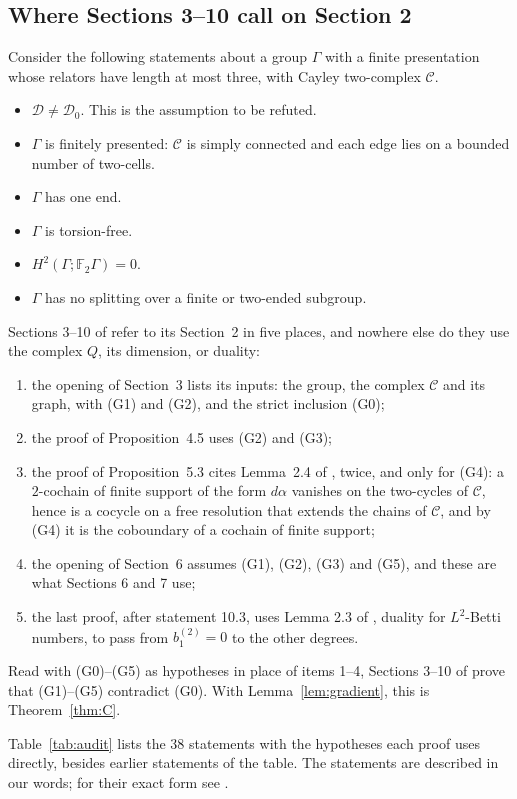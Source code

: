 \documentclass[11pt,a4paper]{article}
\theoremstyle{definition}
\theoremstyle{remark}
\newcommand{\F}{\mathbb{F}}
\newcommand{\Gam}{\Gamma}
\newcommand{\bt}[1]{b^{(2)}_{#1}}
\newcommand{\Dsp}{\mathcal{D}}
\newcommand{\Cay}{\mathcal{C}}
\begin{document}
\subsection{Where Sections 3--10 call on Section 2}\label{sub:interface}
Consider the following statements about a group $\Gam$ with a finite presentation
whose relators have length at most three, with Cayley two-complex $\Cay$.
\begin{itemize}
\item[(G0)] $\Dsp\ne\Dsp_0$. This is the assumption to be refuted.
\item[(G1)] $\Gam$ is finitely presented: $\Cay$ is simply connected and each edge
lies on a bounded number of two-cells.
\item[(G2)] $\Gam$ has one end.
\item[(G3)] $\Gam$ is torsion-free.
\item[(G4)] $H^2(\Gam;\F_2\Gam)=0$.
\item[(G5)] $\Gam$ has no splitting over a finite or two-ended subgroup.
\end{itemize}
Sections 3--10 of \cite{O} refer to its Section~2 in five places, and nowhere else
do they use the complex $Q$, its dimension, or duality:
\begin{enumerate}
\item the opening of Section~3 lists its inputs: the group, the complex $\Cay$ and
its graph, with (G1) and (G2), and the strict inclusion (G0);
\item the proof of Proposition~4.5 uses (G2) and (G3);
\item the proof of Proposition~5.3 cites Lemma~2.4 of \cite{O}, twice, and only
for (G4): a $2$-cochain of finite support of the form $d\alpha$ vanishes on the
two-cycles of $\Cay$, hence is a cocycle on a free resolution that extends the
chains of $\Cay$, and by (G4) it is the coboundary of a cochain of finite support;
\item the opening of Section~6 assumes (G1), (G2), (G3) and (G5), and these are
what Sections 6 and 7 use;
\item the last proof, after statement 10.3, uses Lemma 2.3 of \cite{O}, duality
for $L^2$-Betti numbers, to pass from $\bt{1}=0$ to the other degrees.
\end{enumerate}
Read with (G0)--(G5) as hypotheses in place of items 1--4, Sections 3--10 of
\cite{O} prove that (G1)--(G5) contradict (G0). With Lemma~\ref{lem:gradient},
this is Theorem~\ref{thm:C}.

Table~\ref{tab:audit} lists the 38 statements with the hypotheses each proof
uses directly, besides earlier statements of the table. The statements are
described in our words; for their exact form see \cite{O}.
\end{document}
